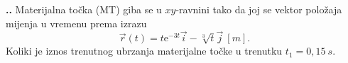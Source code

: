 
\noindent 
\textbf{
\thecjelina.\thezadatak.}
Materijalna točka (MT) giba se u $xy$-ravnini tako da joj se vektor položaja mijenja u
vremenu prema izrazu
$$
\vec{r}(t)=t\mathrm{e}^{-3t}\vec{i}-\sqrt[3]{t}\vec{j}\ [m].
$$
Koliki je iznos trenutnog ubrzanja materijalne točke u trenutku $t_1=0,15\ s$.

